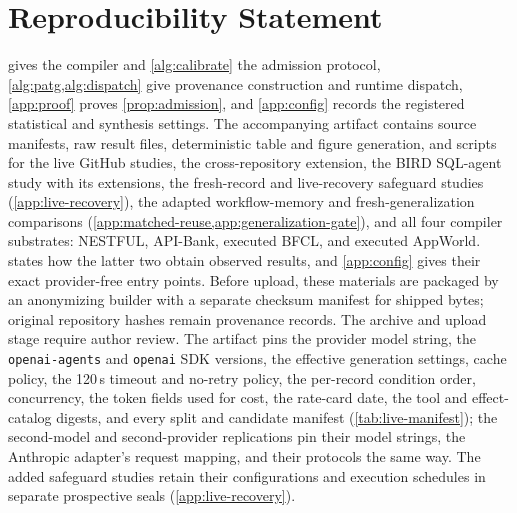 \documentclass{article}
\newcommand{\code}[1]{\texttt{#1}}
\theoremstyle{plain}
\theoremstyle{definition}
\begin{document}
\section*{Reproducibility Statement}
 gives the compiler and \cref{alg:calibrate} the admission protocol,
\cref{alg:patg,alg:dispatch} give provenance construction and runtime dispatch,
\cref{app:proof} proves \cref{prop:admission}, and \cref{app:config} records the
registered statistical and synthesis settings. The accompanying artifact contains source
manifests, raw result files, deterministic table and figure generation, and scripts for
the live GitHub studies, the cross-repository extension, the BIRD SQL-agent
study with its extensions, the fresh-record and live-recovery safeguard studies
(\cref{app:live-recovery}), the adapted workflow-memory and fresh-generalization comparisons
(\cref{app:matched-reuse,app:generalization-gate}), and all four compiler substrates: NESTFUL, API-Bank,
executed BFCL, and executed AppWorld.
 states how the latter two obtain observed results, and
\cref{app:config} gives their exact provider-free entry points. Before upload, these
materials are packaged by an anonymizing builder with a separate checksum
manifest for shipped bytes; original repository hashes remain provenance records.
The archive and upload stage require author review.
The artifact pins the provider model string, the \code{openai-agents} and
\code{openai} SDK versions, the effective generation settings, cache policy,
the 120\,s timeout and no-retry policy, the per-record condition order,
concurrency, the token fields used for cost, the rate-card date, the tool and
effect-catalog digests, and every split and candidate manifest
(\cref{tab:live-manifest}); the second-model and second-provider replications
pin their model strings, the Anthropic adapter's request mapping, and their
protocols the same way. The added safeguard studies retain their configurations
and execution schedules in separate prospective seals (\cref{app:live-recovery}).

\makeatletter
\let\gac@thebibliography\thebibliography
\renewcommand{\thebibliography}[1]{\gac@thebibliography{#1}\interlinepenalty\@M}
\makeatother



\clearpage
\appendix

\end{document}
